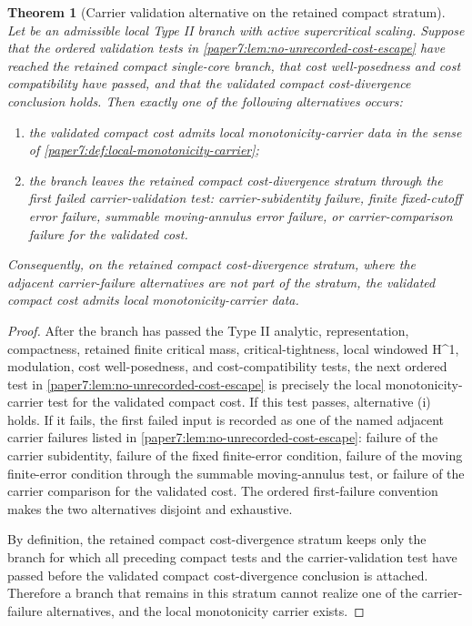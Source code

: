 \documentclass[11pt]{amsart}
\def\({}%
\def\){}%
\theoremstyle{plain}
\newtheorem{theorem}{Theorem}[section]
\theoremstyle{definition}
\theoremstyle{remark}
\begin{document}
\begin{theorem}[Carrier validation alternative on the retained compact stratum]
\label{paper7:thm:carrier-validation-retained-stratum}
Let \(\omega\) be an admissible local Type II branch with active supercritical
scaling.  Suppose that the ordered validation tests in
\cref{paper7:lem:no-unrecorded-cost-escape} have reached the retained compact
single-core branch, that cost well-posedness and cost compatibility have
passed, and that the validated compact cost-divergence conclusion holds.  Then
exactly one of the following alternatives occurs:
\begin{enumerate}[label=\textup{(\roman*)}]
\item the validated compact cost admits local monotonicity-carrier data in the
sense of \cref{paper7:def:local-monotonicity-carrier};
\item the branch leaves the retained compact cost-divergence stratum through
the first failed carrier-validation test: carrier-subidentity failure, finite
fixed-cutoff error failure, summable moving-annulus error failure, or
carrier-comparison failure for the validated cost.
\end{enumerate}
Consequently, on the retained compact cost-divergence stratum, where the
adjacent carrier-failure alternatives are not part of the stratum, the
validated compact cost admits local monotonicity-carrier data.
\end{theorem}

\begin{proof}
After the branch has passed the Type II analytic, representation,
compactness, retained finite critical mass, critical-tightness, local windowed \(H^1\),
modulation, cost well-posedness, and cost-compatibility tests, the next ordered
test in \cref{paper7:lem:no-unrecorded-cost-escape} is precisely the
local monotonicity-carrier test for the validated compact cost.  If this test
passes, alternative \textup{(i)} holds.  If it fails, the first failed input is
recorded as one of the named adjacent carrier failures listed in
\cref{paper7:lem:no-unrecorded-cost-escape}: failure of the carrier
subidentity, failure of the fixed finite-error condition, failure of the moving
finite-error condition through the summable moving-annulus test, or failure of
the carrier comparison for the validated cost.  The ordered first-failure
convention makes the two alternatives disjoint and exhaustive.
\par
By definition, the retained compact cost-divergence stratum keeps only the
branch for which all preceding compact tests and the carrier-validation test
have passed before the validated compact cost-divergence conclusion is
attached.  Therefore a branch that remains in this stratum cannot realize one
of the carrier-failure alternatives, and the local monotonicity carrier exists.
\end{proof}
\end{document}
